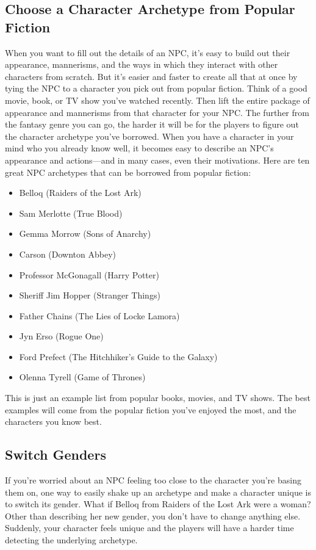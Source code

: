 \documentclass[10pt,a4paper,twoside,bg=print,twocolumn,openany,nodeprecatedcode]{dndbook}
\begin{document}
\subsection{Choose a Character Archetype from Popular Fiction}
When you want to fill out the details of an NPC, it's easy to build out their appearance, mannerisms, and the ways in which they interact with other characters from scratch. But it's easier and faster to create all that at once by tying the NPC to a character you pick out from popular fiction.
Think of a good movie, book, or TV show you've watched recently. Then lift the entire package of appearance and mannerisms from that character for your NPC. The further from the fantasy genre you can go, the harder it will be for the players to figure out the character archetype you've borrowed.
When you have a character in your mind who you already know well, it becomes easy to describe an NPC's appearance and actions—and in many cases, even their motivations.
Here are ten great NPC archetypes that can be borrowed from popular fiction:

\begin{itemize}
\item Belloq (Raiders of the Lost Ark)
\item Sam Merlotte (True Blood)
\item Gemma Morrow (Sons of Anarchy)
\item Carson (Downton Abbey)
\item Professor McGonagall (Harry Potter)
\item Sheriff Jim Hopper (Stranger Things)
\item Father Chains (The Lies of Locke Lamora)
\item Jyn Erso (Rogue One)
\item Ford Prefect (The Hitchhiker's Guide to the Galaxy)
\item Olenna Tyrell (Game of Thrones)
\end{itemize}

This is just an example list from popular books, movies, and TV shows. The best examples will come from the popular fiction you've enjoyed the most, and the characters you know best.
\subsection{Switch Genders}
If you're worried about an NPC feeling too close to the character you're basing them on, one way to easily shake up an archetype and make a character unique is to switch its gender. What if Belloq from Raiders of the Lost Ark were a woman? Other than describing her new gender, you don't have to change anything else. Suddenly, your character feels unique and the players will have a harder time detecting the underlying archetype.
\end{document}
